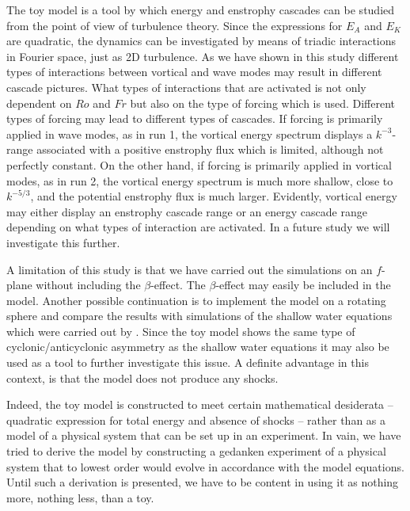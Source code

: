 {The toy model is a tool by which energy and enstrophy cascades can be studied from the point of view of turbulence theory. Since the expressions for $ E_A $  and $ E_K $ are quadratic, the dynamics can be investigated by means of triadic interactions in Fourier space, just as 2D turbulence.  As we have shown in this study different types of interactions between vortical and wave modes may result in different cascade pictures. What types of interactions that are activated is not only dependent on $ Ro $ and $ Fr $ but also on the type of forcing which is used. Different types of forcing may lead to different types of cascades. If forcing is primarily applied in  wave modes, as in run 1, the vortical energy spectrum displays a $ k^{-3} $-range associated with a positive enstrophy flux which is limited, although not perfectly constant.  On the other hand, if forcing is primarily applied in vortical modes, as in run 2, the vortical energy spectrum is much more shallow, close to $ k^{-5/3} $, and the potential enstrophy flux is much larger. Evidently, vortical energy may either display an enstrophy cascade range or an energy cascade range depending on what types of interaction are activated. In a future study we will investigate this further.
}

A limitation of this study is that we have carried out the simulations on an $ f $-plane without including the $ \beta $-effect. The $ \beta $-effect may easily be included in the model. Another possible continuation is to implement the model on a rotating sphere and compare the results with simulations of the shallow water equations which were carried out by \citet{Cho1996}. Since the toy model shows the same type of cyclonic/anticyclonic asymmetry as the shallow water equations it may also be used as a tool to further investigate this issue. A definite advantage in this context, is that the model does not produce any shocks. 

Indeed,  the toy model is constructed to meet certain mathematical desiderata -- quadratic expression for total energy and absence of shocks -- rather than as a model of a physical system that can be set up in an experiment.  In vain, we have tried to derive the model by constructing a gedanken experiment of a physical system that  to lowest order would evolve in accordance with the model equations. Until such a derivation is presented, we have to be content in using it as nothing more, nothing less,  than a toy.

 

